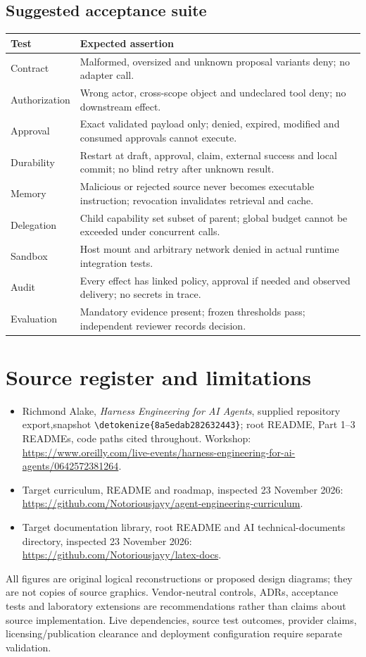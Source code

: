 \documentclass[11pt,letterpaper]{article}
\newcommand{\src}[1]{\expandafter\nolinkurl\expandafter{\detokenize{#1}}}
\begin{document}
\subsection{Suggested acceptance suite}
\begin{longtable}{>{\raggedright\arraybackslash}p{.25\linewidth}>{\raggedright\arraybackslash}p{.66\linewidth}}\toprule
Test & Expected assertion \\\midrule\endhead
Contract & Malformed, oversized and unknown proposal variants deny; no adapter call. \\
Authorization & Wrong actor, cross-scope object and undeclared tool deny; no downstream effect. \\
Approval & Exact validated payload only; denied, expired, modified and consumed approvals cannot execute. \\
Durability & Restart at draft, approval, claim, external success and local commit; no blind retry after unknown result. \\
Memory & Malicious or rejected source never becomes executable instruction; revocation invalidates retrieval and cache. \\
Delegation & Child capability set subset of parent; global budget cannot be exceeded under concurrent calls. \\
Sandbox & Host mount and arbitrary network denied in actual runtime integration tests. \\
Audit & Every effect has linked policy, approval if needed and observed delivery; no secrets in trace. \\
Evaluation & Mandatory evidence present; frozen thresholds pass; independent reviewer records decision. \\
\bottomrule\end{longtable}
\section{Source register and limitations}
\begin{itemize}
\item Richmond Alake, \textit{Harness Engineering for AI Agents}, supplied repository export,\newline snapshot \src{8a5edab282632443}; root README, Part 1--3 READMEs, code paths cited throughout. Workshop: \url{https://www.oreilly.com/live-events/harness-engineering-for-ai-agents/0642572381264}.
\item Target curriculum, README and roadmap, inspected 23 November 2026: \url{https://github.com/Notoriousjayy/agent-engineering-curriculum}.
\item Target documentation library, root README and AI technical-documents directory, inspected 23 November 2026: \url{https://github.com/Notoriousjayy/latex-docs}.
\end{itemize}
All figures are original logical reconstructions or proposed design diagrams; they are not copies of source graphics. Vendor-neutral controls, ADRs, acceptance tests and laboratory extensions are recommendations rather than claims about source implementation. Live dependencies, source test outcomes, provider claims, licensing/publication clearance and deployment configuration require separate validation.
\end{document}
